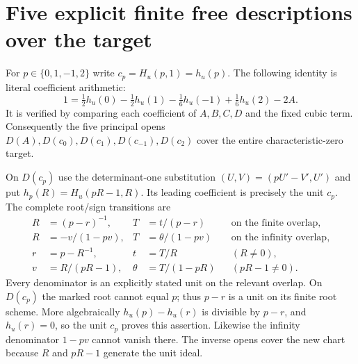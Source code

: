 \documentclass[11pt]{article}
\begin{document}
\section{Five explicit finite free descriptions over the target}
For $p\in\{0,1,-1,2\}$ write $c_p=H_u(p,1)=h_u(p)$.
The following identity is literal coefficient arithmetic:
\begin{equation}
1=\tfrac12h_u(0)-\tfrac12h_u(1)-\tfrac16h_u(-1)
                       +\tfrac16h_u(2)-2A .
\tag{FS6}
\end{equation}
It is verified by comparing each coefficient of $A,B,C,D$
and the fixed cubic term. Consequently the five principal
opens $D(A),D(c_0),D(c_1),D(c_{-1}),D(c_2)$ cover the
entire characteristic-zero target.

On $D(c_p)$ use the determinant-one substitution
$(U,V)=(pU'-V',U')$ and put
$h_p(R)=H_u(pR-1,R)$. Its leading coefficient is precisely
the unit $c_p$. The complete root/sign transitions are
\begin{align}
R&=(p-r)^{-1},&T&=t/(p-r)
                    &&\text{on the finite overlap},\nonumber\\
R&=-v/(1-pv),&T&=\theta/(1-pv)
                    &&\text{on the infinity overlap},\nonumber\\
r&=p-R^{-1},&t&=T/R&& (R\ne0),\nonumber\\
v&=R/(pR-1),&\theta&=T/(1-pR)&& (pR-1\ne0).
\tag{FS7}
\end{align}
Every denominator is an explicitly stated unit on the relevant
overlap. On $D(c_p)$ the marked root cannot equal $p$;
thus $p-r$ is a unit on its finite root scheme. More
algebraically $h_u(p)-h_u(r)$ is divisible by $p-r$,
and $h_u(r)=0$, so the unit $c_p$ proves this assertion.
Likewise the infinity denominator $1-pv$ cannot vanish
there. The inverse opens cover the new chart because $R$
and $pR-1$ generate the unit ideal.
\end{document}
